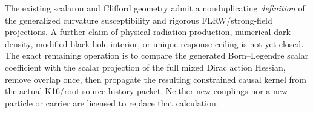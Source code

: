 \documentclass[12pt,a4paper]{article}
\begin{document}
\begin{remark}
\label{p8:rem:v2166-generalized-response-frontier}
The existing scalaron and Clifford geometry admit a nonduplicating
\emph{definition} of the generalized curvature susceptibility and rigorous
FLRW/strong-field projections.  A further claim of physical radiation
production, numerical dark density, modified black-hole interior, or unique
response ceiling is not yet closed.  The exact remaining operation is to
compare the generated Born--Legendre scalar coefficient with the scalar
projection of the full mixed Dirac action Hessian, remove overlap once,
then propagate the resulting constrained causal kernel from the actual
K16/root source-history packet.  Neither new couplings nor a new particle
or carrier are licensed to replace that calculation.
\end{remark}



\end{document}
